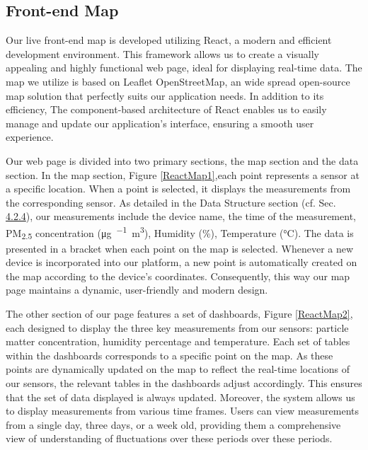 \subsection{Front-end Map}
Our live front-end map is developed utilizing React, a modern and efficient development environment. This framework allows us to create a visually appealing and highly functional web page, ideal for displaying real-time data. The map we utilize is based on Leaflet OpenStreetMap, an wide spread open-source map solution that perfectly suits our application needs. In addition to its efficiency, The component-based architecture of React enables us to easily manage and update our application's interface, ensuring a smooth user experience.

Our web page is divided into two primary sections, the map section and the data section. In the map section, Figure \ref{ReactMap1},each point represents a sensor at a specific location. When a point is selected, it displays the measurements from the corresponding sensor. As detailed in the Data Structure section (cf. Sec. \hyperref[data_structure]{4.2.4}), our measurements include the device name, the time of the measurement, PM\textsubscript{2.5} concentration (\si{\micro\gram\per\/\cubic\meter}), Humidity (\%), Temperature (\si{\celsius}). The data is presented in a bracket when each point on the map is selected. Whenever a new device is incorporated into our platform, a new point is automatically created on the map according to the device's coordinates. Consequently, this way our map page maintains a dynamic, user-friendly and modern design.

The other section of our page features a set of dashboards, Figure \ref{ReactMap2}, each designed to display the three key measurements from our sensors: particle matter concentration, humidity percentage and temperature. Each set of tables within the dashboards corresponds to a specific point on the map. As these points are dynamically updated on the map to reflect the real-time locations of our sensors, the relevant tables in the dashboards adjust accordingly. This ensures that the set of data displayed is always updated. Moreover, the system allows us to display measurements from various time frames. Users can view measurements from a single day, three days, or a week old, providing them a comprehensive view of understanding of fluctuations over these periods over these periods.

